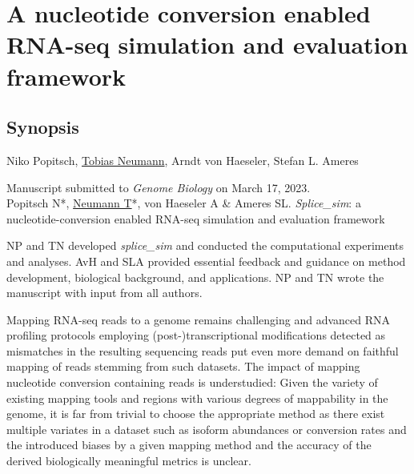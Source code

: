 
\chapter[A nucleotide conversion enabled RNA-seq simulation and evaluation framework]{A nucleotide conversion enabled RNA-seq simulation and evaluation framework}
\label{chap:splice_sim}

\section{Synopsis}
    
\begin{description}[style=nextline]
    \item [Authors] Niko Popitsch, \underline{Tobias Neumann}, Arndt von Haeseler, Stefan L. Ameres \vspace{0.5cm}
    \item[Manuscript status] Manuscript submitted to \textit{Genome Biology} on March 17, 2023. \vspace{0.5cm} \\
    Popitsch N*, \underline{Neumann T}*, von Haeseler A \& Ameres SL. \textit{Splice\_sim}: a nucleotide-conversion enabled RNA-seq simulation and evaluation framework \vspace{0.5cm}
    \item[Author contributions] NP and TN developed \textit{splice\_sim} and conducted the computational experiments and analyses. AvH and SLA provided essential feedback and guidance on method development, biological background, and applications. NP and TN wrote the manuscript with input from all authors.
\end{description}

Mapping RNA-seq reads to a genome remains challenging and advanced RNA profiling protocols employing (post-)transcriptional modifications detected as mismatches in the resulting sequencing reads put even more demand on faithful mapping of reads stemming from such datasets. The impact of mapping nucleotide conversion containing reads is understudied: Given the variety of existing mapping tools and regions with various degrees of mappability in the genome, it is far from trivial to choose the appropriate method as there exist multiple variates in a dataset such as isoform abundances or conversion rates and the introduced biases by a given mapping method and the accuracy of the derived biologically meaningful metrics is unclear. \vspace{0.5cm}


